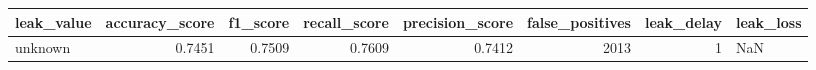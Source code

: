 \begin{tabular}{lrrrrrrl}
\toprule
leak\_value & accuracy\_score & f1\_score & recall\_score & precision\_score & false\_positives & leak\_delay & leak\_loss \\
\midrule
unknown & 0.7451 & 0.7509 & 0.7609 & 0.7412 & 2013 & 1 & NaN \\
\bottomrule
\end{tabular}
